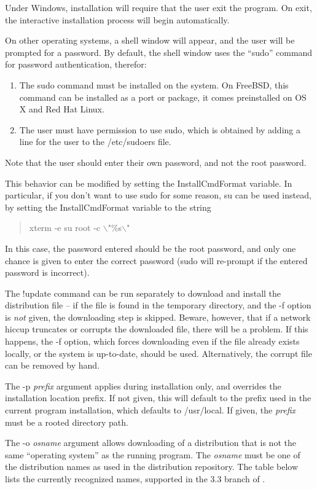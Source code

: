 Under Windows, installation will require that the user exit the
program.  On exit, the interactive installation process will begin
automatically.

On other operating systems, a shell window will appear, and the user
will be prompted for a password.  By default, the shell window uses
the ``{\vt sudo}'' command for password authentication, therefor:
\begin{enumerate}
\item{The {\vt sudo} command must be installed on the system.
On FreeBSD, this command can be installed as a port or package, it
comes preinstalled on OS X and Red Hat Linux.}
\item{The user must have permission to use {\vt sudo}, which is
obtained by adding a line for the user to the {\vt /etc/sudoers} file.}
\end{enumerate}
Note that the user should enter their own password, and not the
root password.

This behavior can be modified by setting the {\et InstallCmdFormat}
variable.  In particular, if you don't want to use {\vt sudo} for some
reason, {\vt su} can be used instead, by setting the {\et
InstallCmdFormat} variable to the string
\begin{quote}
\vt xterm -e su root -c $\backslash$"\%s$\backslash$"
\end{quote}
In this case, the password entered should be the root password, and
only one chance is given to enter the correct password ({\vt sudo}
will re-prompt if the entered password is incorrect).

The {\cb !update} command can be run separately to download and
install the distribution file -- if the file is found in the temporary
directory, and the {\vt -f} option is {\it not} given, the downloading
step is skipped.  Beware, however, that if a network hiccup truncates
or corrupts the downloaded file, there will be a problem.  If this
happens, the {\vt -f} option, which forces downloading even if the file
already exists locally, or the system is up-to-date, should be used. 
Alternatively, the corrupt file can be removed by hand.

The {\vt -p} {\it prefix} argument applies during installation only,
and overrides the installation location prefix.  If not given, this
will default to the prefix used in the current program installation,
which defaults to {\vt /usr/local}.  If given, the {\it prefix} must
be a rooted directory path.

The {\vt -o} {\it osname} argument allows downloading of a
distribution that is not the same ``operating system'' as the running
program.  The {\it osname} must be one of the distribution names as
used in the distribution repository.  The table below lists the
currently recognized names, supported in the 3.3 branch of {\Xic}.

